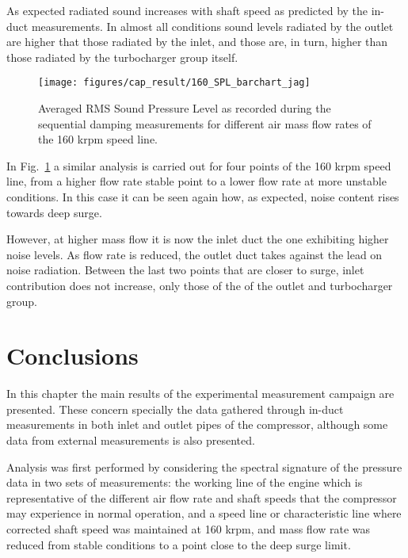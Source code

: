 As expected radiated sound increases with shaft speed as predicted by the in-duct measurements. In almost all conditions sound levels radiated by the outlet are higher that those radiated by the inlet, and those are, in turn, higher than those radiated by the turbocharger group itself.

\begin{figure}[tbh!]
\centering
\texttt{[image: figures/cap\_result/160\_SPL\_barchart\_jag]}
\caption{Averaged RMS Sound Pressure Level as recorded during the sequential damping measurements for different air mass flow rates of the 160 krpm speed line.}
\label{fig:result_spl_radiated_comp_bar_160}
\end{figure}

In Fig.~\ref{fig:result_spl_radiated_comp_bar_160} a similar analysis is carried out for four points of the 160 krpm speed line, from a higher flow rate stable point to a lower flow rate at more unstable conditions. In this case it can be seen again how, as expected, noise content rises towards deep surge.

However, at higher mass flow it is now the inlet duct the one exhibiting higher noise levels. As flow rate is reduced, the outlet duct takes against the lead on noise radiation. Between the last two points that are closer to surge, inlet contribution does not increase, only those of the of the outlet and turbocharger group.


\section{Conclusions}

In this chapter the main results of the experimental measurement campaign are presented. These concern specially the data gathered through in-duct measurements in both inlet and outlet pipes of the compressor, although some data from external measurements is also presented.

Analysis was first performed by considering the spectral signature of the pressure data in two sets of measurements: the working line of the engine which is representative of the different air flow rate and shaft speeds that the compressor may experience in normal operation, and a speed line or characteristic line where corrected shaft speed was maintained at 160 krpm, and mass flow rate was reduced from stable conditions to a point close to the deep surge limit.


